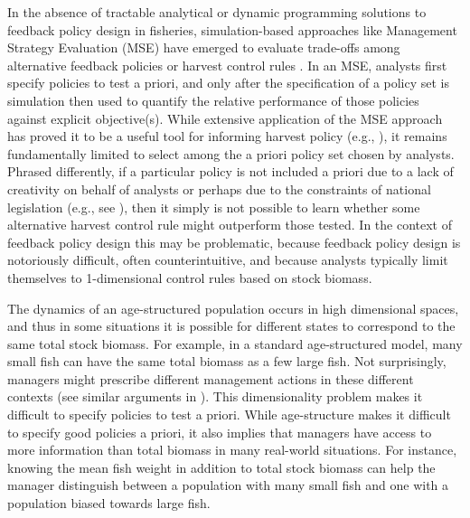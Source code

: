 \documentclass[floatfix,nofootinbib,longbibliography,notitlepage]{revtex4-1}
\def\eg{e.g.}
\begin{document}
In the absence of tractable analytical or dynamic programming solutions to feedback policy design in fisheries, simulation-based approaches like Management Strategy Evaluation (MSE) have emerged to evaluate trade-offs among alternative feedback policies or harvest control rules \cite{punt-mse}.
In an MSE, analysts first specify policies to test a priori, and only after the specification of a policy set is simulation then used to quantify the relative performance of those policies against explicit objective(s).
While extensive application of the MSE approach has proved it to be a useful tool for informing harvest policy (\eg, \cite{edwards2016-mse}), it remains fundamentally limited to select among the a priori policy set chosen by analysts.  
Phrased differently, if a particular policy is not included a priori due to a lack of creativity on behalf of analysts or perhaps due to the constraints of national legislation (\eg, see \cite{dfo2006}), then it simply is not possible to learn whether some alternative harvest control rule might outperform those tested.  
In the context of feedback policy design this may be problematic, because feedback policy design is notoriously difficult, often counterintuitive, and because analysts typically limit themselves to 1-dimensional control rules based on stock biomass. 
	
The dynamics  of an age-structured population occurs in  high dimensional spaces, and thus in some situations it is possible for different states to correspond to the same total stock biomass.  
For example, in a standard  age-structured model, many small fish can have the same total biomass as a few large fish. Not surprisingly, managers might prescribe different management actions  in  these different contexts (see similar arguments in \cite{hilborn2002}). 
This dimensionality problem makes it difficult  to specify policies to test a priori. 
While age-structure makes it difficult to specify good policies a priori, it also implies that  managers have access to more information than total biomass in many real-world situations. 
For instance, knowing the mean fish weight in addition to total stock biomass can help the manager distinguish between a population with many small fish and one with a population biased towards large fish. 
	
\end{document}

